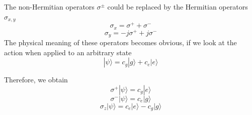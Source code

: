 \documentclass[book.tex]{subfiles}
\begin{document}
The non-Hermitian operators $\sigma^\pm$ could be replaced by the Hermitian operators $\sigma_{x,y}$
\begin{equation}
    \sigma_x=\sigma^+ +\sigma^-
\end{equation}
\begin{equation}
    \sigma_y=-j\sigma^+ +j\sigma^-
\end{equation}
The physical meaning of these operators becomes obvious, if we look at the action when applied to an arbitrary state
\begin{equation}
    |\psi\rangle =c_g |g\rangle + c_e |e\rangle
\end{equation}

Therefore, we obtain
\begin{equation}
    \sigma^+|\psi\rangle=c_g|e\rangle
\end{equation}
\begin{equation}
    \sigma^-|\psi\rangle=c_e|g\rangle
\end{equation}
\begin{equation}
    \sigma_z|\psi\rangle=c_e|e\rangle-c_g|g\rangle
\end{equation}
\end{document}
